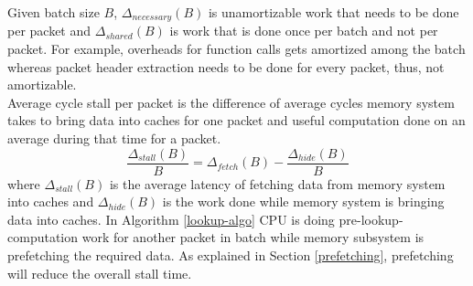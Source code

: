 Given batch size $B$, $\Delta_{necessary}(B)$ is unamortizable work that needs to be done per packet and $\Delta_{shared}(B)$ is work that is done once per batch and not per packet. For example, overheads for function calls gets amortized among the batch whereas packet header extraction needs to be done for every packet, thus, not amortizable.
\\
Average cycle stall per packet is the difference of average cycles memory system takes to bring data into caches for one packet and useful computation done on an average during that time for a packet.
\\
\begin{equation}
\label{cycles_stall}
\frac{\Delta_{stall}(B)}{B} = \Delta_{fetch}(B) - \frac{\Delta_{hide}(B)}{B}
\end{equation}
where $\Delta_{stall}(B)$ is the average latency of fetching data from memory system into caches and $\Delta_{hide}(B)$ is the work done while memory system is bringing data into caches. In Algorithm \ref{lookup-algo} CPU is doing pre-lookup-computation work for another packet in batch while memory subsystem is prefetching the required data. As explained in Section \ref{prefetching}, prefetching will reduce the overall stall time.
